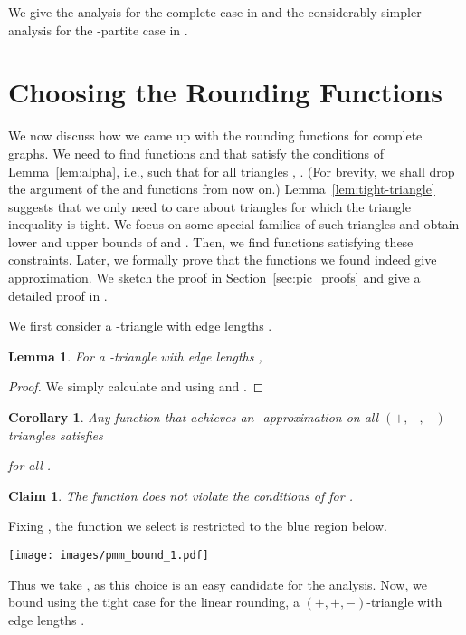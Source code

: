 \documentclass[11pt]{article}
\newtheorem{lemma}[theorem]{Lemma}
\newtheorem{corollary}[theorem]{Corollary}
\newtheorem{claim}[theorem]{Claim}
\theoremstyle{definition}
\theoremstyle{remark}
\newcommand{\ppm}{\ensuremath{(+,+,-)}}
\newcommand{\pmm}{\ensuremath{(+,-,-)}}
\begin{document}
We give the analysis for the complete case in  and the
considerably simpler analysis for the -partite case in
.

 \section{Choosing the Rounding Functions}\label{sec:choosing_f}
We now discuss how we came up with the rounding functions  for complete graphs.
We need to find functions  and  that satisfy the conditions
of Lemma~\ref{lem:alpha}, i.e., such that for all triangles ,
. (For brevity, we shall drop the argument  of
the  and  functions from now on.) Lemma~\ref{lem:tight-triangle} suggests that
we only need to care about triangles for which the triangle inequality is
tight. We focus on some special families of such triangles and obtain lower and
upper bounds of  and . Then, we find functions satisfying these constraints.
Later, we formally prove that the functions we found indeed give 
approximation. We sketch the proof in Section~\ref{sec:pic_proofs} and give a detailed
proof in .

We first consider a -triangle with edge lengths .
\begin{lemma}
For a -triangle with edge lengths ,

\end{lemma}

\begin{proof}
We simply calculate  and  using  and
.
\end{proof}

\begin{corollary}\label{cor:fmbound}
Any function  that achieves an -approximation on all \pmm-triangles satisfies
	
for all .
\end{corollary}


\begin{claim}
	The function  does not violate the conditions of  for .
\end{claim}

Fixing , the function we select is restricted to the blue region below.
\begin{center}
	\texttt{[image: images/pmm\_bound\_1.pdf]}
\end{center}

Thus we take , as this choice is an easy candidate for the analysis.
Now, we bound  using the tight case for the linear rounding, a
\ppm-triangle with edge lengths .
\end{document}
